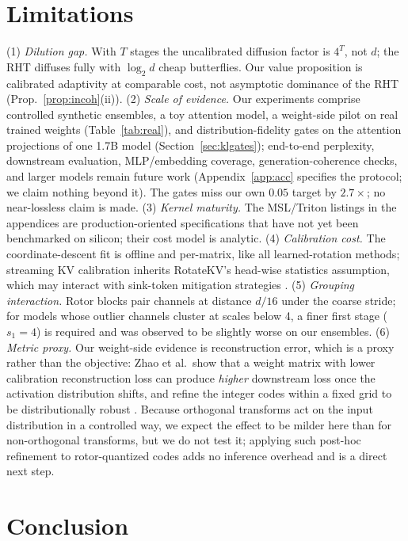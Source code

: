 \documentclass{article}
\begin{document}
\section{Limitations}
\label{sec:limitations}

(1) \emph{Dilution gap.} With $T$ stages the uncalibrated diffusion factor is
$4^{T}$, not $d$; the RHT diffuses fully with $\log_2 d$ cheap butterflies. Our
value proposition is calibrated adaptivity at comparable cost, not asymptotic
dominance of the RHT (Prop.~\ref{prop:incoh}(ii)). (2) \emph{Scale of evidence.} Our experiments comprise controlled synthetic
ensembles, a toy attention model, a weight-side pilot on real trained
weights (Table~\ref{tab:real}), and distribution-fidelity gates on the
attention projections of one 1.7B model (Section~\ref{sec:klgates});
end-to-end perplexity, downstream evaluation, MLP/embedding coverage,
generation-coherence checks, and larger models remain future work
(Appendix~\ref{app:acc} specifies the protocol; we claim nothing beyond
it). The gates miss our own $0.05$ target by $2.7\times$; no
near-lossless claim is made.
(3) \emph{Kernel maturity.} The MSL/Triton listings in the appendices are
production-oriented specifications that have not yet been benchmarked on
silicon; their cost model is analytic. (4) \emph{Calibration cost.} The
coordinate-descent fit is offline and per-matrix, like all learned-rotation
methods; streaming KV calibration inherits RotateKV's head-wise statistics
assumption, which may interact with sink-token mitigation strategies
\citep{su2025rotatekv,sun2024massive}. (5) \emph{Grouping interaction.} Rotor
blocks pair channels at distance $d/16$ under the coarse stride; for models
whose outlier channels cluster at scales below 4, a finer first stage
($s_1=4$) is required and was observed to be slightly worse on our ensembles.
(6) \emph{Metric proxy.} Our weight-side evidence is reconstruction error,
which is a proxy rather than the objective: Zhao et al.\ show that a weight
matrix with lower calibration reconstruction loss can produce \emph{higher}
downstream loss once the activation distribution shifts, and refine the integer
codes within a fixed grid to be distributionally robust \citep{zhao2026drq}.
Because orthogonal transforms act on the input distribution in a controlled
way, we expect the effect to be milder here than for non-orthogonal transforms,
but we do not test it; applying such post-hoc refinement to rotor-quantized
codes adds no inference overhead and is a direct next step.

\section{Conclusion}
\end{document}
